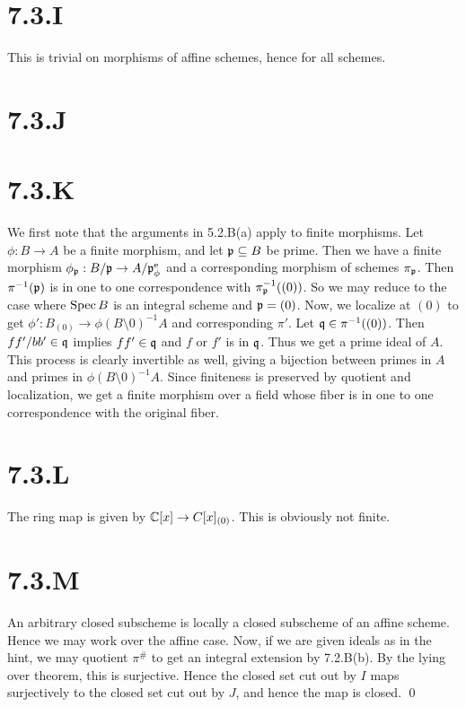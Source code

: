 \documentclass{article}
\begin{document}
\section{7.3.I}
This is trivial on morphisms of affine schemes, hence for all schemes.

\section{7.3.J}

\section{7.3.K}
We first note that the arguments in 5.2.B(a) apply to finite morphisms. Let
$\phi: B \to A$ be a finite morphism, and let $\mathfrak{p} \subseteq B$ be prime. Then
we have a finite morphism $\phi_{\mathfrak{p}}: B/\mathfrak{p} \to A/\mathfrak{p}^{\text{e}}_\phi$ and a
corresponding morphism of schemes $\pi_{\mathfrak{p}}$. Then $\pi^{-1}(\mathfrak{p})$ is in one to
one correspondence with $\pi_{\mathfrak{p}}^{-1}((0))$. So we may reduce to the case
where $\operatorname{Spec} B$ is an integral scheme and $\mathfrak{p}=(0)$. Now, we localize at $(0)$
to get $\phi': B_{(0)} \to \phi(B\setminus 0)^{-1}A$ and corresponding $\pi'$.
Let $\mathfrak{q} \in \pi^{-1}((0))$. Then $ff'/bb' \in \mathfrak{q}$ implies $ff' \in \mathfrak{q}$ and $f$
or $f'$ is in $\mathfrak{q}$. Thus we get a prime ideal of $A$. This process is clearly
invertible as well, giving a bijection between primes in $A$ and primes in
$\phi(B\setminus 0)^{-1}A$. Since finiteness is preserved by quotient and
localization, we get a finite morphism over a field whose fiber is in one to
one correspondence with the original fiber.

\section{7.3.L}
The ring map is given by $\mathbb{C}[x] \to C[x]_{(0)}$. This is obviously not finite.

\section{7.3.M}
An arbitrary closed subscheme is locally a closed subscheme of an affine
scheme. Hence we may work over the affine case. Now, if we are given ideals as
in the hint, we may quotient $\pi^{\#}$ to get an integral extension by
7.2.B(b). By the lying over theorem, this is surjective. Hence the closed set
cut out by $I$ maps surjectively to the closed set cut out by $J$, and hence
the map is closed. \qed
\end{document}

